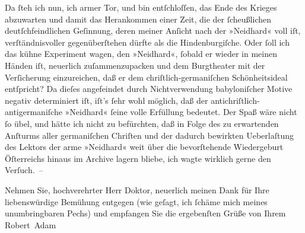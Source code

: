 \pstart
           Da ſteh ich nun, ich armer
               Tor, und bin entſchloſſen, das Ende des Krieges abzuwarten und damit das
               Herankommen einer Zeit, die der ſcheußlichen deutſchfeindlichen Geſinnung, deren
               meiner Anſicht nach der »Neidhard« voll iſt,
               verſtändnisvoller gegenüberſtehen dürfte als die Hindenburgiſche. Oder ſoll ich das kühne Experiment wagen, den »Neidhard«, ſobald er wieder in meinen Händen iſt,
               neuerlich zuſammenzupacken und dem Burgtheater mit
               der Verſicherung einzureichen, daß er dem chriſtlich-germaniſchen Schönheitsideal
               entſpricht? Da dieſes angefeindet {\pb}durch
               Nichtverwendung babyloniſcher Motive negativ
               determiniert iſt, iſt’s ſehr wohl möglich, daß der antichriſtlich-antigermaniſche
                  »Neidhard« ſeine volle Erfüllung bedeutet.
               Der Spaß wäre nicht ſo übel, und hätte ich nicht zu befürchten, daß in Folge des zu
               erwartenden Anſturms aller germaniſchen Chriſten und der dadurch bewirkten
               Ueberlaſtung des Lektors der arme »Neidhard«
                   weit über die bevorſtehende Wiedergeburt Öſterreichs hinaus im Archive lagern bliebe, ich
               wagte wirklich gerne den Verſuch. –\pend
           
\pstart
           Nehmen Sie, hochverehrter Herr Doktor, neuerlich meinen Dank für Ihre liebenswürdige
               Bemühung entgegen (wie geſagt, ich ſchäme mich meines unumbringbaren Pechs) und
               empfangen Sie die ergebenſten Grüße von Ihrem\pend
           \pstart \spacefill\mbox{Robert Adam}\pend{}\endnumbering{}  
      